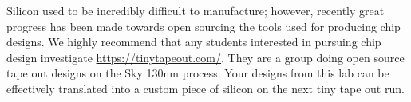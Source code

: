 Silicon used to be incredibly difficult to manufacture; however, recently great progress has been made towards open sourcing the tools used for producing chip designs. We highly recommend that any students interested in pursuing chip design investigate \url{https://tinytapeout.com/}. They are a group doing open source tape out designs on the Sky 130nm process. Your designs from this lab can be effectively translated into a custom piece of silicon on the next tiny tape out run. 